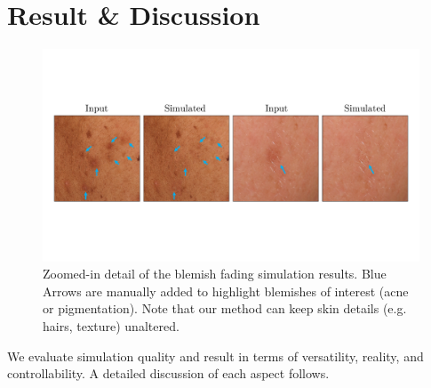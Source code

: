 
\chapter{Result \& Discussion}
\begin{spacing}{1.5}
\setlength{\parskip}{0.3in}
\begin{figure}[h]
    \centering
    \includegraphics[width=0.9\linewidth]{Chapter5/img_comp2.pdf}
    \caption{Zoomed-in detail of the blemish fading simulation results. Blue Arrows are manually added to highlight blemishes of interest (acne or pigmentation). Note that our method can keep skin details (e.g. hairs, texture) unaltered.}
    \label{fig:sim2}
\end{figure}
We evaluate simulation quality and result in terms of versatility, reality, and controllability. A detailed discussion of each aspect follows.


\end{spacing}
